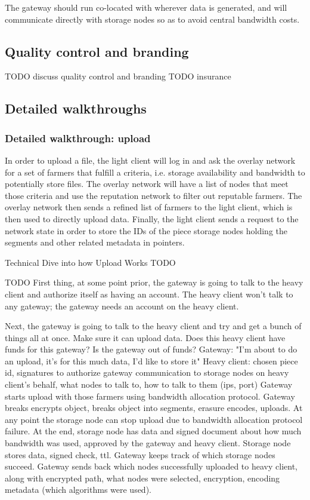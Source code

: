\documentclass[a4paper,10pt]{article} \usepackage[utf8]{inputenc}
\newcommand{\todo}[1]{{\color{red} TODO #1 }}
\begin{document}
The gateway should run co-located with wherever data is generated, and will
communicate directly with storage nodes so as to avoid central bandwidth costs.

\subsection{Quality control and branding}

\todo{discuss quality control and branding}
\todo{insurance}

\subsection{Detailed walkthroughs}

\subsubsection{Detailed walkthrough: upload}

In order to upload a file, the light client will log in
and ask the overlay network for a set of farmers that fulfill a criteria, i.e.
storage availability and bandwidth to potentially store files. The overlay
network will have a list of nodes that meet those criteria and use the
reputation network to filter out reputable farmers. The overlay network then
sends a refined list of farmers to the light client, which is then used to
directly upload data. Finally, the light client sends a request to the network
state in order to store the IDs of the piece storage nodes holding the segments
and other related metadata in pointers.

Technical Dive into how Upload Works \todo{}

\todo{
First thing, at some point prior, the gateway is going to talk to the heavy
client and authorize itself as having an account. The heavy client won't talk
to any gateway; the gateway needs an account on the heavy client.

Next, the gateway is going to talk to the heavy client and try and get a bunch
of things all at once.
Make sure it can upload data. Does this heavy client have funds for this
gateway? Is the gateway out of funds?
Gateway: "I'm about to do an upload, it's for this much data, I'd like to
         store it"
Heavy client: chosen piece id, signatures to authorize gateway communication
   to storage nodes on heavy client's behalf, what nodes to talk to, how
   to talk to them (ips, port)
Gateway starts upload with those farmers using bandwidth allocation protocol.
Gateway breaks encrypts object, breaks object into segments, erasure encodes,
uploads.
At any point the storage node can stop upload due to bandwidth allocation
protocol failure.
At the end, storage node has data and signed document about how much
bandwidth was used, approved by the gateway and heavy client. Storage node
stores data, signed check, ttl.
Gateway keeps track of which storage nodes succeed.
Gateway sends back which nodes successfully uploaded to heavy client, along
with encrypted path, what nodes were selected, encryption, encoding metadata
(which algorithms were used).
}
\end{document}
